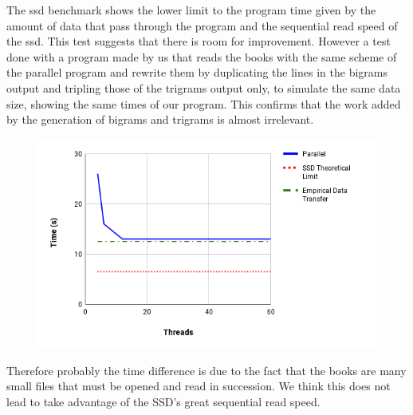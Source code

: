 \documentclass[10pt,twocolumn,letterpaper]{article}
\begin{document}
The ssd benchmark shows the lower limit to the program time given by the amount of data that pass through the program and the sequential read speed of the ssd. This test suggests that there is room for improvement.
However a test done with a program made by us that reads the books with the same scheme of the parallel program and rewrite them by duplicating the lines in the bigrams output and tripling those of the trigrams output only, to simulate the same data size, showing the same times  of our program. This confirms that the work added by the generation of bigrams and trigrams is almost irrelevant.


\begin{figure}[H]
\begin{center}
\includegraphics[width=\columnwidth]{template/latex/ssd.png}
\end{center}
\end{figure}

%
Therefore probably the time difference is due to the fact that the books are many small files that must be opened and read in succession.
We think this does not lead to take advantage of the SSD's great sequential read speed.
\end{document}
